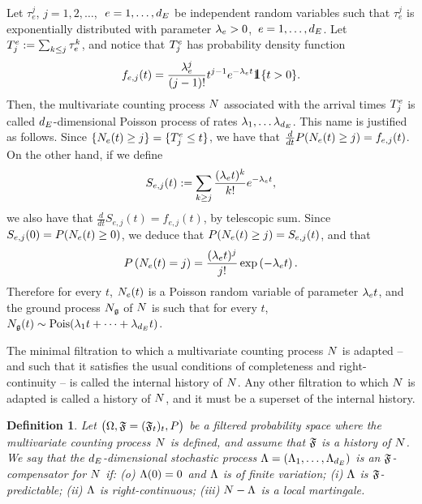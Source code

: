 \documentclass[10pt, article,table]{article}
\newtheorem{defi}[thm]{Definition}
\begin{document}
\begin{example}
 Let $\tau_e^j$, $j=1,2,\dots$, $\, \, e=1,\dots, \numEventTypes$ be independent random variables such that $\tau_e^j$ is exponentially distributed with parameter $\intensity>0$, $\, e=1,\dots, \numEventTypes$. Let $\arrivalTimes_{j} := \sum_{k\leq j} \tau_e^{k}$, and notice that $\arrivalTimes_{j}$ has probability density function 
 \begin{equation*}
  f_{e,j}(t) = \frac{\intensity^j}{(j-1)!}t^{j-1} e^{-\intensity t} \one\lbrace t>0\rbrace.
 \end{equation*}
 Then, the multivariate counting process $\multiCountingProc$ associated with the arrival times $\arrivalTimes_{j}$ is called $\numEventTypes$-dimensional Poisson process of rates $\intensity[1], \dots \intensity[\numEventTypes]$. This name is justified as follows. 
 Since $\lbrace \countingProc(t)\geq j\rbrace = \lbrace \arrivalTimes_{j} \leq t\rbrace$, we have that $\frac{d}{dt} \Prob(\countingProc(t) \geq j) = f_{e,j} (t)$. On the other hand, if we define 
 \begin{equation*}
  S_{e,j}(t) := \sum_{k\geq j} \frac{(\intensity t)^k}{k!}e^{-\intensity t},
 \end{equation*}
we also have that $\frac{d}{dt} S_{e,j}(t) = f_{e,j}(t)$, by telescopic sum. Since $S_{e,j}(0) = \Prob (\countingProc(t)\geq 0)$, we deduce that $\Prob(\countingProc(t) \geq j) = S_{e,j}(t)$, and that
\begin{equation*}
 \Prob\left( \countingProc(t) = j\right) = 
 \frac{(\intensity t)^j}{j!} \exp\left( -\intensity t\right).
\end{equation*}
Therefore for every $t$, $\countingProc(t)$ is a Poisson random variable of parameter $\intensity t$, and the ground process $\groundProc$ of $\multiCountingProc$ is such that for every $t$, $\groundProc(t) \sim \text{Pois}(\intensity[1]t + \dots + \intensity[\numEventTypes]t)$.
\end{example}

The minimal filtration to which a multivariate counting process $\multiCountingProc$ is adapted -- and such that it satisfies the usual conditions of completeness and right-continuity -- is called the internal history of $\multiCountingProc$. Any other filtration to which $\multiCountingProc$ is adapted is called a history of $\multiCountingProc$, and it must be a superset of the internal history. 

\begin{defi}\label{def.compensator}
 Let $\stochasticBase$ be a filtered probability space where the multivariate counting process $\multiCountingProc$ is defined, and assume that $\filtrationF$ is a history of $\multiCountingProc$. We say that the $\numEventTypes$-dimensional stochastic process $\compensator = (\compensator_1, \dots , \compensator_{\numEventTypes})$ is an $\filtrationF$-compensator for $\multiCountingProc$ if: (o) $\compensator(0)=0$ and $\compensator$ is of finite variation; (i) $\compensator$ is $\filtrationF$-predictable; (ii) $\compensator$ is right-continuous; (iii) $\multiCountingProc - \compensator$ is a local martingale. 
\end{defi}
\end{document}
